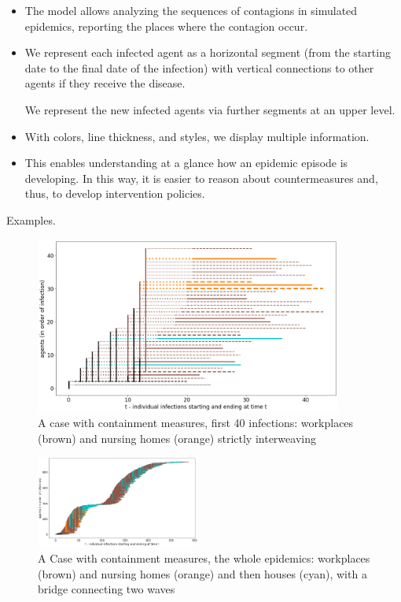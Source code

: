 \documentclass[graybox]{svmult}
\begin{document}
 \begin{itemize}
 \item
The model allows analyzing the sequences of contagions in simulated epidemics, reporting the places where the contagion occur. 
 \item
We represent each infected agent as a horizontal segment (from the starting date to the final date of the infection) with vertical connections to other agents if they receive the disease.

We represent the new infected agents via further segments at an upper level. 

 \item
With colors, line thickness, and styles, we display multiple information. 

 \item
This enables understanding at a glance how an epidemic episode is developing. In this way, it is easier to reason about countermeasures and, thus, to develop intervention policies.

 \end{itemize}

Examples.

\begin{figure}[t]
\center
\includegraphics[width=0.9\textwidth]{with8b40.png}%
\caption{A case with containment measures, first 40 infections: workplaces (brown) and nursing homes (orange) strictly interweaving}
\label{workplacesNursingHomes}
\end{figure}


\begin{figure}[t]
\center
\includegraphics[width=0.48\textwidth]{with8a.png}%
\caption{A Case with containment measures, the whole epidemics: workplaces (brown) and nursing homes (orange) and then houses (cyan), with a bridge connecting two waves}
\label{workplacesNursingHomesFull}
\end{figure}
\end{document}
